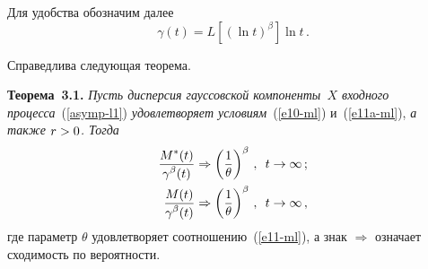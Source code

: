\begin{multicols}{2}
Для удобства обозначим далее
\begin{equation*}
\gamma(t)=L\left[\left(\ln t
\right)^\beta\right]  \ln t \,.
\end{equation*}

Справедлива следующая теорема.


\medskip

\noindent
\textbf{Теорема~3.1.}
\textit{Пусть дисперсия гауссовской компоненты~$X$ входного  процесса}~(\ref{asymp-l1}) 
\textit{удовлетворяет условиям}~(\ref{e10-ml}) и~(\ref{e11a-ml}), \textit{а
также $r\hm>0$. Тогда}
\begin{align}
\displaystyle\frac{\displaystyle M^*(t)\mathstrut}{\displaystyle \gamma^\beta(t)\mathstrut} & \Rightarrow
\left(\displaystyle\frac{\displaystyle 1\mathstrut}{\displaystyle \theta\mathstrut}\right)^\beta\,,\enskip t \to \infty\,;
\label{asymp1-l8}\\
\displaystyle\frac{\displaystyle M(t)\mathstrut}{\displaystyle \gamma^\beta(t)\mathstrut} &\Rightarrow
\left(\displaystyle\frac{\displaystyle 1\mathstrut}{\displaystyle \theta\mathstrut}\right)^\beta\,,\enskip t \to \infty\,,
\label{asymp1-l9}
\end{align}
где параметр $\theta$ удовлетворяет соотношению~(\ref{e11-ml}), а знак
$\Rightarrow$ означает сходимость по вероятности.

\medskip



\end{multicols}
